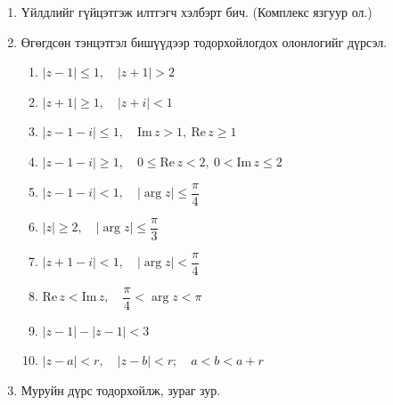 \begin{enumerate}
\item Үйлдлийг гүйцэтгэж илтгэгч хэлбэрт бич. (Комплекс язгуур ол.)
\begin{enumerate}
\end{enumerate}
\item Өгөгдсөн тэнцэтгэл бишүүдээр тодорхойлогдох олонлогийг дүрсэл.
\begin{enumerate}
\item $|z-1|\le 1,\quad |z+1|>2$
\item $|z+1|\ge 1,\quad |z+i|<1$
\item $|z-1-i|\le 1,\quad \mathrm{Im}\,z>1,\ \mathrm{Re}\,z\ge 1$
\item $|z-1-i|\ge 1,\quad 0\le \mathrm{Re}\,z<2,\ 0<\mathrm{Im}\,z\le 2$
\item $|z-1-i|<1,\quad |\arg z|\le \dfrac{\pi}{4}$
\item $|z|\ge 2,\quad |\arg z|\le \dfrac{\pi}{3}$
\item $|z+1-i|<1,\quad |\arg z|<\dfrac{\pi}{4}$
\item $\mathrm{Re}\,z<\mathrm{Im}\,z,\quad \dfrac{\pi}{4}<\arg z<\pi$
\item $|z-1|-|z-1|<3$
\item $|z-a|<r,\quad |z-b|<r;\quad a<b<a+r$
\end{enumerate}
\item Муруйн дүрс тодорхойлж, зураг зур.
\begin{enumerate}
\end{enumerate}
\end{enumerate}
\newpage
